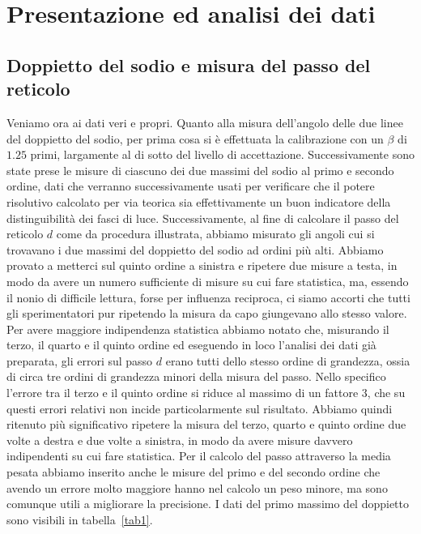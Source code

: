 \documentclass[a4paper,10pt]{article}
\begin{document}
	
	\section{Presentazione ed analisi dei dati}
	\subsection{Doppietto del sodio e misura del passo del reticolo}
	Veniamo ora ai dati veri e propri. Quanto alla misura dell'angolo delle due linee del doppietto del sodio, per prima cosa si è effettuata la calibrazione con un $\beta$ di $1.25$ primi, largamente al di sotto del livello di accettazione. Successivamente sono state prese le misure di ciascuno dei due massimi del sodio al primo e secondo ordine, dati che verranno successivamente usati per verificare che il potere risolutivo calcolato per via teorica sia effettivamente un buon indicatore della distinguibilità dei fasci di luce. Successivamente, al fine di calcolare il passo del reticolo $d$ come da procedura illustrata, abbiamo misurato gli angoli cui si trovavano i due massimi del doppietto del sodio ad ordini più alti. Abbiamo provato a metterci sul quinto ordine a sinistra e ripetere due misure a testa, in modo da avere un numero sufficiente di misure su cui fare statistica, ma, essendo il nonio di difficile lettura, forse per influenza reciproca, ci siamo accorti che tutti gli sperimentatori pur ripetendo la misura da capo giungevano allo stesso valore. Per avere maggiore indipendenza statistica abbiamo notato che, misurando il terzo, il quarto e il quinto ordine ed eseguendo in loco l'analisi dei dati già preparata, gli errori sul passo $d$ erano tutti dello stesso ordine di grandezza, ossia di circa tre ordini di grandezza minori della misura del passo. Nello specifico l'errore tra il terzo e il quinto ordine si riduce al massimo di un fattore $3$, che su questi errori relativi non incide particolarmente sul risultato. Abbiamo quindi ritenuto più significativo ripetere la misura del terzo, quarto e quinto ordine due volte a destra e due volte a sinistra, in modo da avere misure davvero indipendenti su cui fare statistica. Per il calcolo del passo attraverso la media pesata abbiamo inserito anche le misure del primo e del secondo ordine che avendo un errore molto maggiore hanno nel calcolo un peso minore, ma sono comunque utili a migliorare la precisione. I dati del primo massimo del doppietto sono visibili in tabella~\ref{tab1}.
	
\end{document}
